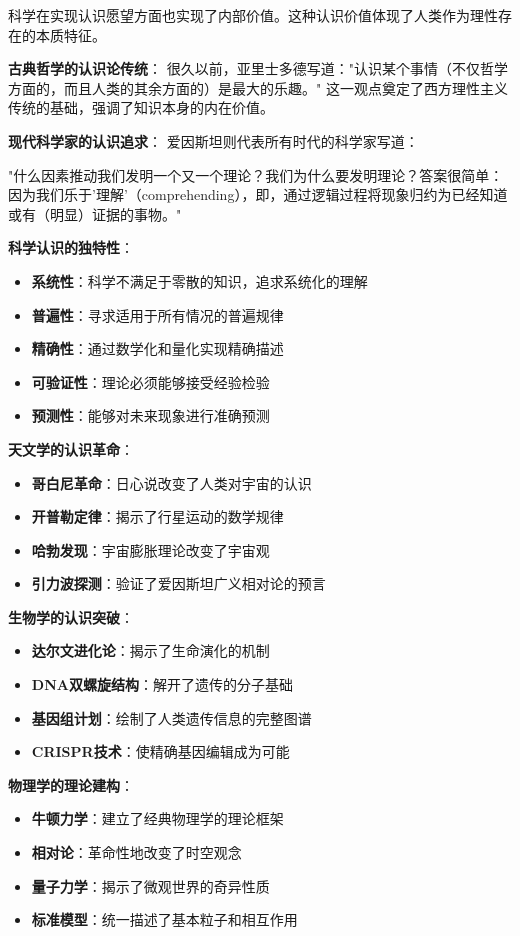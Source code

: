 \begin{theorembox}[title=科学认识价值的哲学基础]
科学在实现认识愿望方面也实现了内部价值。这种认识价值体现了人类作为理性存在的本质特征。

\textbf{古典哲学的认识论传统}：
很久以前，亚里士多德写道："认识某个事情（不仅哲学方面的，而且人类的其余方面的）是最大的乐趣。"\cite{aristotle1950} 这一观点奠定了西方理性主义传统的基础，强调了知识本身的内在价值。

\textbf{现代科学家的认识追求}：
爱因斯坦则代表所有时代的科学家写道：

"什么因素推动我们发明一个又一个理论？我们为什么要发明理论？答案很简单：因为我们乐于'理解'（comprehending），即，通过逻辑过程将现象归约为已经知道或有（明显）证据的事物。"\cite{einstein1935}

\textbf{科学认识的独特性}：
\begin{itemize}
\item \textbf{系统性}：科学不满足于零散的知识，追求系统化的理解
\item \textbf{普遍性}：寻求适用于所有情况的普遍规律
\item \textbf{精确性}：通过数学化和量化实现精确描述
\item \textbf{可验证性}：理论必须能够接受经验检验
\item \textbf{预测性}：能够对未来现象进行准确预测
\end{itemize}
\end{theorembox}

\begin{examplebox}[title=科学认识价值的历史见证]
\textbf{天文学的认识革命}：
\begin{itemize}
\item \textbf{哥白尼革命}：日心说改变了人类对宇宙的认识
\item \textbf{开普勒定律}：揭示了行星运动的数学规律
\item \textbf{哈勃发现}：宇宙膨胀理论改变了宇宙观
\item \textbf{引力波探测}：验证了爱因斯坦广义相对论的预言
\end{itemize}

\textbf{生物学的认识突破}：
\begin{itemize}
\item \textbf{达尔文进化论}：揭示了生命演化的机制
\item \textbf{DNA双螺旋结构}：解开了遗传的分子基础
\item \textbf{基因组计划}：绘制了人类遗传信息的完整图谱
\item \textbf{CRISPR技术}：使精确基因编辑成为可能
\end{itemize}

\textbf{物理学的理论建构}：
\begin{itemize}
\item \textbf{牛顿力学}：建立了经典物理学的理论框架
\item \textbf{相对论}：革命性地改变了时空观念
\item \textbf{量子力学}：揭示了微观世界的奇异性质
\item \textbf{标准模型}：统一描述了基本粒子和相互作用
\end{itemize}
\end{examplebox}

